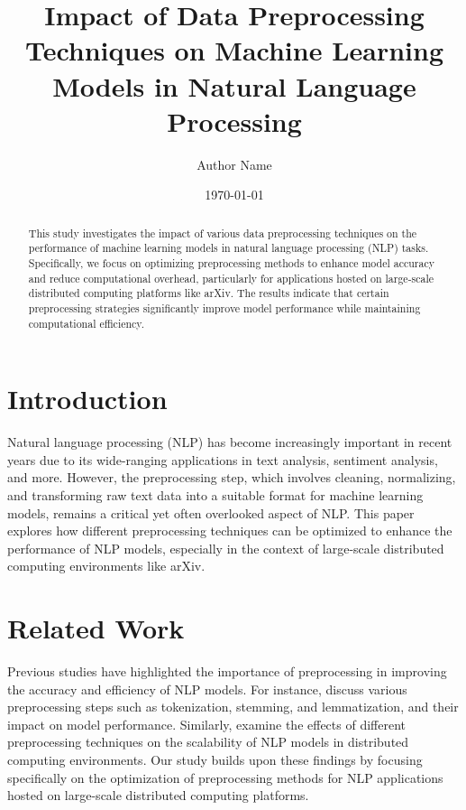 \documentclass{article}
\title{Impact of Data Preprocessing Techniques on Machine Learning Models in Natural Language Processing}
\author{Author Name}
\date{\today}
\begin{document}
\maketitle

\begin{abstract}
This study investigates the impact of various data preprocessing techniques on the performance of machine learning models in natural language processing (NLP) tasks. Specifically, we focus on optimizing preprocessing methods to enhance model accuracy and reduce computational overhead, particularly for applications hosted on large-scale distributed computing platforms like arXiv. The results indicate that certain preprocessing strategies significantly improve model performance while maintaining computational efficiency.
\end{abstract}

\section{Introduction}
Natural language processing (NLP) has become increasingly important in recent years due to its wide-ranging applications in text analysis, sentiment analysis, and more. However, the preprocessing step, which involves cleaning, normalizing, and transforming raw text data into a suitable format for machine learning models, remains a critical yet often overlooked aspect of NLP. This paper explores how different preprocessing techniques can be optimized to enhance the performance of NLP models, especially in the context of large-scale distributed computing environments like arXiv.

\section{Related Work}
Previous studies have highlighted the importance of preprocessing in improving the accuracy and efficiency of NLP models. For instance, \cite{manning2008foundation} discuss various preprocessing steps such as tokenization, stemming, and lemmatization, and their impact on model performance. Similarly, \cite{peng2019large} examine the effects of different preprocessing techniques on the scalability of NLP models in distributed computing environments. Our study builds upon these findings by focusing specifically on the optimization of preprocessing methods for NLP applications hosted on large-scale distributed computing platforms.
\end{document}
